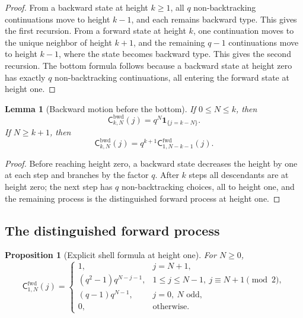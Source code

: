 \documentclass[11pt]{amsart}
\theoremstyle{definition}
\theoremstyle{plain}
\newtheorem{lemma}[definition]{Lemma}
\newtheorem{proposition}[definition]{Proposition}
\newcommand{\fwd}{\mathrm{fwd}}
\newcommand{\bwd}{\mathrm{bwd}}
\begin{document}
\begin{proof}
From a backward state at height \(k\ge1\), all \(q\) non-backtracking
continuations move to height \(k-1\), and each remains backward type.  This gives
the first recursion.  From a forward state at height \(k\), one continuation moves
to the unique neighbor of height \(k+1\), and the remaining \(q-1\) continuations
move to height \(k-1\), where the state becomes backward type.  This gives the
second recursion.  The bottom formula follows because a backward state at height
zero has exactly \(q\) non-backtracking continuations, all entering the forward
state at height one.
\end{proof}

\begin{lemma}[Backward motion before the bottom]\label{lem:back-before-bottom}
If \(0\le N\le k\), then
\[
\mathsf C^{\bwd}_{k,N}(j)=q^N\mathbf 1_{\{j=k-N\}}.
\]
If \(N\ge k+1\), then
\[
\mathsf C^{\bwd}_{k,N}(j)=q^{k+1}\mathsf C^{\fwd}_{1,N-k-1}(j).
\]
\end{lemma}

\begin{proof}
Before reaching height zero, a backward state decreases the height by one at each
step and branches by the factor \(q\).  After \(k\) steps all descendants are at
height zero; the next step has \(q\) non-backtracking choices, all to height one,
and the remaining process is the distinguished forward process at height one.
\end{proof}

\subsection{The distinguished forward process}
\begin{proposition}[Explicit shell formula at height one]\label{prop:forward-one-shell}
For \(N\ge0\),
\[
\mathsf C^{\fwd}_{1,N}(j)=
\begin{cases}
1, & j=N+1,\\
(q^2-1)q^{N-j-1}, & 1\le j\le N-1,\ j\equiv N+1\pmod2,\\
(q-1)q^{N-1}, & j=0,\ N\text{ odd},\\
0, & \text{otherwise}.
\end{cases}
\]
\end{proposition}
\end{document}
